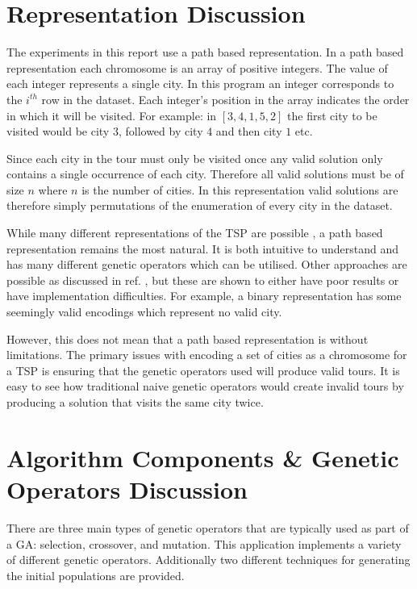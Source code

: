 \documentclass[journal]{IEEEtran}
\begin{document}
\section{Representation Discussion}
The experiments in this report  use a path based representation. In a path based representation each chromosome is an array of positive integers. The value of each integer represents a single city. In this program an integer corresponds to the $i^{th}$ row in the dataset. Each integer's position in the array indicates the order in which it will be visited. For example: in $[3, 4, 1, 5, 2]$ the first city to be visited would be city $3$, followed by city $4$ and then city $1$ etc. 

Since each city in the tour must only be visited once any valid solution only contains a single occurrence of each city. Therefore all valid solutions must be of size $n$ where $n$ is the number of cities. In this representation valid solutions are therefore simply permutations of the enumeration of every city in the dataset.

While many different representations of the TSP are possible \cite{larranaga1999genetic}, a path based representation remains the most natural. It is both intuitive to understand and has many different genetic operators which can be utilised. Other approaches are possible as discussed in ref. \cite{larranaga1999genetic}, but these are shown to either have poor results or have implementation difficulties. For example, a binary representation has some seemingly valid encodings which represent no valid city.

However, this does not mean that a path based representation is without limitations. The primary issues with encoding a set of cities as a chromosome for a TSP is ensuring that the genetic operators used will produce valid tours.  It is easy to see how traditional naive genetic operators would create invalid tours by producing a solution that visits the same city twice.

\section{Algorithm Components \& Genetic Operators Discussion}
There are three main types of genetic operators that are typically used as part of a GA: selection, crossover, and mutation. This application implements a variety of different genetic operators. Additionally two different techniques for generating the initial populations are provided.
\end{document}
